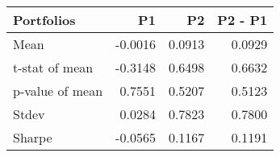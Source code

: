 \begin{tabular}{lrrr}
\toprule
Portfolios & P1 & P2 & P2 - P1 \\
\midrule
Mean & -0.0016 & 0.0913 & 0.0929 \\
t-stat of mean & -0.3148 & 0.6498 & 0.6632 \\
p-value of mean & 0.7551 & 0.5207 & 0.5123 \\
Stdev & 0.0284 & 0.7823 & 0.7800 \\
Sharpe & -0.0565 & 0.1167 & 0.1191 \\
\bottomrule
\end{tabular}
